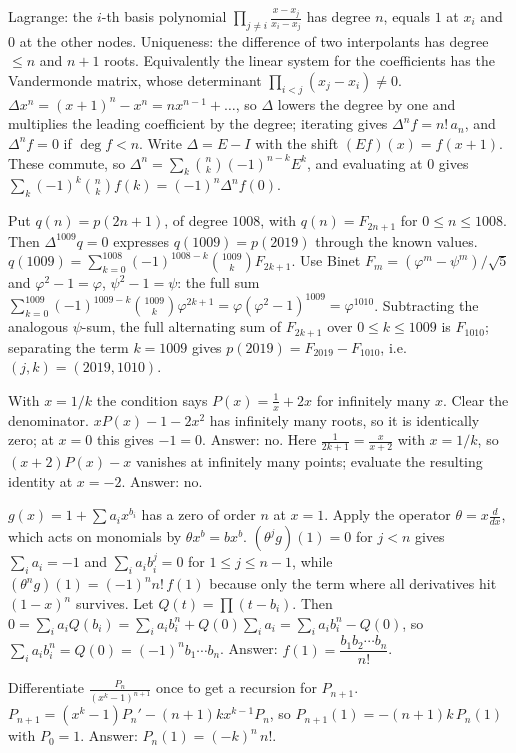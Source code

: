 \documentclass[11pt,a4paper]{article}
\begin{document}

 Lagrange: the $i$-th basis polynomial $\prod_{j\ne i}\frac{x-x_j}{x_i-x_j}$ has degree $n$, equals $1$ at $x_i$ and $0$ at the other nodes. Uniqueness: the difference of two interpolants has degree $\le n$ and $n+1$ roots. Equivalently the linear system for the coefficients has the Vandermonde matrix, whose determinant $\prod_{i<j}(x_j-x_i)\ne0$.
 $\Delta x^n=(x+1)^n-x^n=nx^{n-1}+\dots$, so $\Delta$ lowers the degree by one and multiplies the leading coefficient by the degree; iterating gives $\Delta^nf=n!\,a_n$, and $\Delta^nf=0$ if $\deg f<n$.
 Write $\Delta=E-I$ with the shift $(Ef)(x)=f(x+1)$. These commute, so $\Delta^n=\sum_k\binom nk(-1)^{n-k}E^k$, and evaluating at $0$ gives $\sum_k(-1)^k\binom nkf(k)=(-1)^n\Delta^nf(0)$.

 Put $q(n)=p(2n+1)$, of degree $1008$, with $q(n)=F_{2n+1}$ for $0\le n\le1008$. Then $\Delta^{1009}q=0$ expresses $q(1009)=p(2019)$ through the known values.
 $q(1009)=\sum_{k=0}^{1008}(-1)^{1008-k}\binom{1009}kF_{2k+1}$. Use Binet $F_m=(\varphi^m-\psi^m)/\sqrt5$ and $\varphi^2-1=\varphi$, $\psi^2-1=\psi$: the full sum $\sum_{k=0}^{1009}(-1)^{1009-k}\binom{1009}k\varphi^{2k+1}=\varphi(\varphi^2-1)^{1009}=\varphi^{1010}$.
 Subtracting the analogous $\psi$-sum, the full alternating sum of $F_{2k+1}$ over $0\le k\le1009$ is $F_{1010}$; separating the term $k=1009$ gives $p(2019)=F_{2019}-F_{1010}$, i.e.\ $(j,k)=(2019,1010)$.

 With $x=1/k$ the condition says $P(x)=\frac1x+2x$ for infinitely many $x$. Clear the denominator.
 $xP(x)-1-2x^2$ has infinitely many roots, so it is identically zero; at $x=0$ this gives $-1=0$. Answer: no.
 Here $\frac1{2k+1}=\frac{x}{x+2}$ with $x=1/k$, so $(x+2)P(x)-x$ vanishes at infinitely many points; evaluate the resulting identity at $x=-2$. Answer: no.

 $g(x)=1+\sum a_ix^{b_i}$ has a zero of order $n$ at $x=1$. Apply the operator $\theta=x\frac{d}{dx}$, which acts on monomials by $\theta x^b=bx^b$.
 $(\theta^jg)(1)=0$ for $j<n$ gives $\sum_ia_i=-1$ and $\sum_ia_ib_i^j=0$ for $1\le j\le n-1$, while $(\theta^ng)(1)=(-1)^nn!\,f(1)$ because only the term where all derivatives hit $(1-x)^n$ survives.
 Let $Q(t)=\prod(t-b_i)$. Then $0=\sum_ia_iQ(b_i)=\sum_ia_ib_i^n+Q(0)\sum_ia_i=\sum_ia_ib_i^n-Q(0)$, so $\sum_ia_ib_i^n=Q(0)=(-1)^n b_1\cdots b_n$. Answer: $f(1)=\dfrac{b_1b_2\cdots b_n}{n!}$.

 Differentiate $\frac{P_n}{(x^k-1)^{n+1}}$ once to get a recursion for $P_{n+1}$.
 $P_{n+1}=(x^k-1)P_n'-(n+1)kx^{k-1}P_n$, so $P_{n+1}(1)=-(n+1)k\,P_n(1)$ with $P_0=1$. Answer: $P_n(1)=(-k)^n\,n!$.
\end{document}

